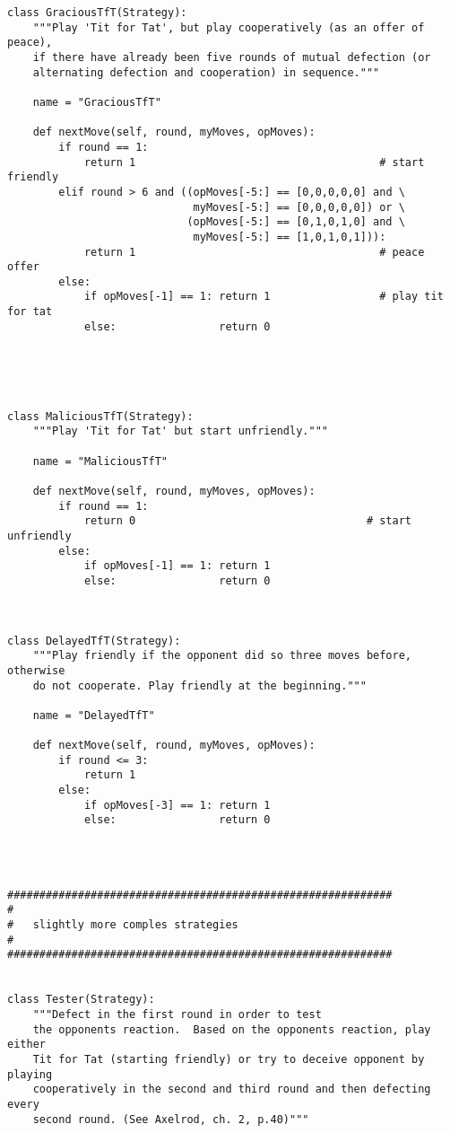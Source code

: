\documentclass[12pt,a4paper,ngerman]{article}
\begin{document}
\begin{scriptsize}
\begin{verbatim}
class GraciousTfT(Strategy):
    """Play 'Tit for Tat', but play cooperatively (as an offer of peace),
    if there have already been five rounds of mutual defection (or
    alternating defection and cooperation) in sequence."""

    name = "GraciousTfT"

    def nextMove(self, round, myMoves, opMoves):
        if round == 1:
            return 1                                      # start friendly
        elif round > 6 and ((opMoves[-5:] == [0,0,0,0,0] and \
                             myMoves[-5:] == [0,0,0,0,0]) or \
                            (opMoves[-5:] == [0,1,0,1,0] and \
                             myMoves[-5:] == [1,0,1,0,1])):
            return 1                                      # peace offer
        else:
            if opMoves[-1] == 1: return 1                 # play tit for tat
            else:                return 0





class MaliciousTfT(Strategy):
    """Play 'Tit for Tat' but start unfriendly."""

    name = "MaliciousTfT"

    def nextMove(self, round, myMoves, opMoves):
        if round == 1:
            return 0                                    # start unfriendly
        else:
            if opMoves[-1] == 1: return 1
            else:                return 0



class DelayedTfT(Strategy):
    """Play friendly if the opponent did so three moves before, otherwise
    do not cooperate. Play friendly at the beginning."""

    name = "DelayedTfT"

    def nextMove(self, round, myMoves, opMoves):
        if round <= 3:
            return 1
        else:
            if opMoves[-3] == 1: return 1
            else:                return 0




############################################################
#
#   slightly more comples strategies
#
############################################################


class Tester(Strategy):
    """Defect in the first round in order to test
    the opponents reaction.  Based on the opponents reaction, play either
    Tit for Tat (starting friendly) or try to deceive opponent by playing
    cooperatively in the second and third round and then defecting every
    second round. (See Axelrod, ch. 2, p.40)"""


\end{verbatim}
\end{scriptsize}
\end{document}
